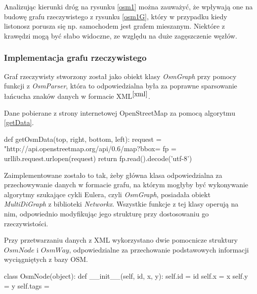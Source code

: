 \documentclass[a4paper, 12pt, twoside, openright]{article}
\begin{document}
Analizując kierunki dróg na rysunku \ref{osm1} można zauważyć, że wpływają one na budowę grafu rzeczywistego z rysunku \ref{osm1G}, który w przypadku kiedy listonosz porusza się np. samochodem jest grafem mieszanym. Niektóre z krawędzi mogą być słabo widoczne, ze względu na duże zagęszczenie węzłów.


\subsubsection{Implementacja grafu rzeczywistego}
\indent\par
Graf rzeczywisty stworzony został  jako obiekt klasy \textit{OsmGraph} przy pomocy funkcji z \textit{OsmParser}, która to odpowiedzialna była za poprawne sparsowanie łańcucha znaków danych w formacie XML$^{\cite{xml}}$.

Dane pobierane z strony internetowej OpenStreetMap za pomocą algorytmu \ref{getData}.
\begin{algorithm}[caption={\textit{getOsmData} funkcja pobierająca dane z strony \textit{opensteermap.org} w formacie \textit{osm}, dla zadanych jej początkowych wartości szerokości i długości geograficznych, tworzących prostokątny obszar do wygenerowania danych.}, label={getData}]
  def getOsmData(top, right, bottom, left):
	  request = "http://api.openstreetmap.org/api/0.6/map?bbox=%
	  fp = urllib.request.urlopen(request)
	  return fp.read().decode('utf-8') 
\end{algorithm}

Zaimplementowane zostało to tak, żeby główna klasa odpowiedzialna za przechowywanie danych w formacie grafu, na którym mogłyby być wykonywanie algorytmy szukające cykli Eulera, czyli \textit{OsmGraph}, posiadała obiekt \textit{MultiDiGraph} z biblioteki \textit{Networkx}. Wszystkie funkcje z tej klasy operują na nim, odpowiednio modyfikując jego strukturę przy dostosowaniu go rzeczywistości.

Przy przetwarzaniu danych z XML wykorzystano dwie pomocnicze struktury $OsmNode$ i $OsmWay$, odpowiedzialne za przechowanie podstawowych informacji wyciągniętych z bazy OSM.\\
\begin{algorithm}[caption={\textit{OsmNode} struktura tagu XML - $node$, w którym przechowywane są punkty }, label={OsmNode}]
class OsmNode(object):
	def __init__(self, id, x, y):
		self.id = id
		self.x = x
		self.y = y
		self.tags = {}
\end{algorithm}
\end{document}
